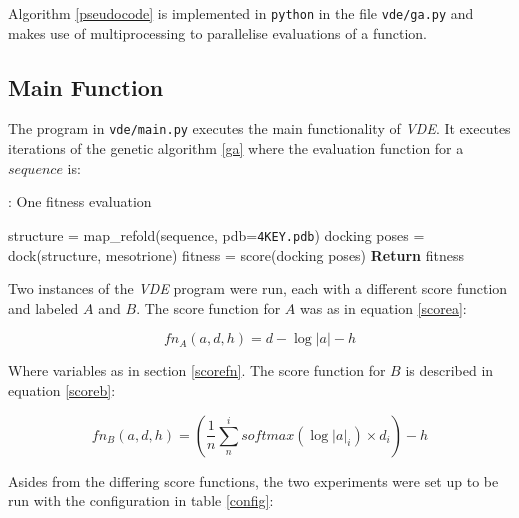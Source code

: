\documentclass[16pt]{article}
\begin{document}
Algorithm \ref{pseudocode} is implemented in \texttt{python} in the file \texttt{vde/ga.py} and makes use of multiprocessing to parallelise evaluations of a function.

\subsection{Main Function \label{main}}
The program in \texttt{vde/main.py} executes the main functionality of \textit{VDE}.
It executes iterations of the genetic algorithm \ref{ga} where the evaluation function for a $sequence $ is:

\begin{algorithm}
	\caption{\label{fitness}: One fitness evaluation}
	\begin{algorithmic}
		\State structure = map\_refold(sequence, pdb=\texttt{4KEY.pdb}) 
		\State docking poses = dock(structure, mesotrione) 
		\State fitness = score(docking poses) 
		\State \textbf{Return} fitness
		\EndProcedure
	\end{algorithmic}
\end{algorithm}

Two instances of the \textit{VDE} program were run, each with a different score function and labeled $A$ and $B$.
The score function for $A$ was as in equation \ref{scorea}:

\begin{equation}\label{scorea}
	fn_A(a, d, h) = d - \log{|a|} - h
\end{equation}

Where variables as in section \ref{scorefn}.
The score function for $B$ is described in equation \ref{scoreb}:

\begin{equation}\label{scoreb}
	fn_B(a, d, h) = (\frac{1}{n} \sum_{n}^{i} softmax(\log{|a|}_i)\times d_i) -  h
\end{equation}

Asides from the differing score functions, the two experiments were set up to be run with the configuration in table \ref{config}:
\end{document}
